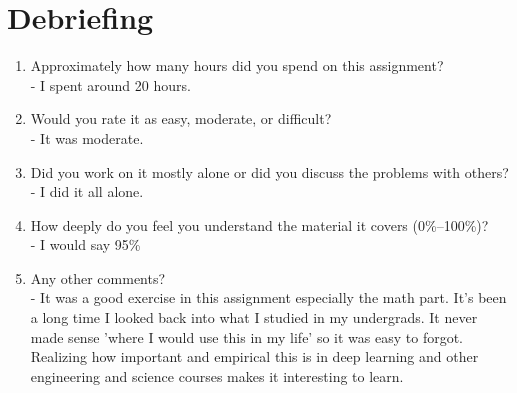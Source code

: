 \documentclass[a4paper,10pt]{article}
\begin{document}
\section{Debriefing}
\begin{enumerate}
    \item Approximately how many hours did you spend on this assignment?
    \\ - I spent around 20 hours.
    \item Would you rate it as easy, moderate, or difficult?
    \\ - It was moderate.
    \item Did you work on it mostly alone or did you discuss the problems with others?
    \\ - I did it all alone.
    \item How deeply do you feel you understand the material it covers (0\%–100\%)?
    \\ - I would say 95\%
    \item Any other comments?
    \\ - It was a good exercise in this assignment especially the math part. It's been a long time I looked back into what I studied in my undergrads. It never made sense 'where I would use this in my life' so it was easy to forgot. Realizing how important and empirical this is in deep learning and other engineering and science courses makes it interesting to learn.
\end{enumerate}
\end{document}
